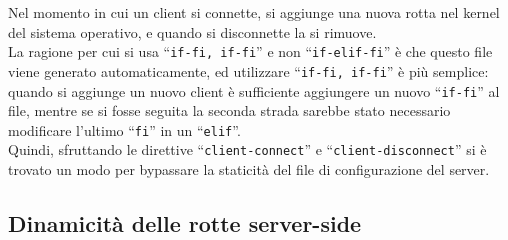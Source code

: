 Nel momento in cui un client si connette, si aggiunge una nuova rotta nel kernel
del sistema operativo, e quando si disconnette la si rimuove.\\
La ragione per cui si usa ``\texttt{if-fi, if-fi}'' e non ``\texttt{if-elif-fi}''
è che questo file viene generato automaticamente, ed utilizzare ``\texttt{if-fi, if-fi}''
è più semplice: quando si aggiunge un nuovo client è sufficiente aggiungere un
nuovo ``\texttt{if-fi}'' al file, mentre se si fosse seguita la seconda strada
sarebbe stato necessario modificare l'ultimo ``\texttt{fi}'' in un ``\texttt{elif}''.\\
Quindi, sfruttando le direttive ``\texttt{client-connect}'' e ``\texttt{client-disconnect}''
si è trovato un modo per bypassare la staticità del file di configurazione del server.\\



\subsection{Dinamicità delle rotte server-side}
